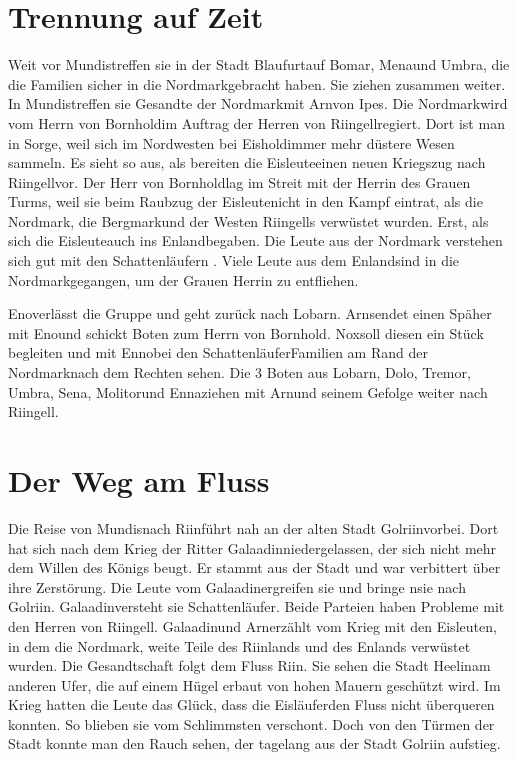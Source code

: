 \documentclass[12pt,a4paper,onecolumn,twoside,ngerman]{book}
\newcommand{\Molitor}{Molitor}
\newcommand{\Sena}{Sena}
\newcommand{\Enland}{Enland}
\newcommand{\Schattenlaufer}{Schattenläufer}
\newcommand{\Eno}{Eno}
\newcommand{\Bomar}{Bomar}
\newcommand{\Dolo}{Dolo}
\newcommand{\Nox}{Nox}
\newcommand{\Mena}{Mena}
\newcommand{\Umbra}{Umbra}
\newcommand{\Enna}{Enna}
\newcommand{\Enno}{Enno}
\newcommand{\Tremor}{Tremor}
\newcommand{\Lobarn}{Lobarn}
\newcommand{\Nordmark}{Nordmark}
\newcommand{\Bergmark}{Bergmark}
\newcommand{\Ipes}{Ipes}
\newcommand{\Bornhold}{Bornhold}
\newcommand{\Eishold}{Eishold}
\newcommand{\Arn}{Arn}
\newcommand{\Eislaufer}{Eisläufer}
\newcommand{\Eisleute}{Eisleute}
\newcommand{\Rhinland}{Riinland}
\newcommand{\Rhingell}{Riingell}
\newcommand{\Blaufurt}{Blaufurt}
\newcommand{\Mundis}{Mundis}
\newcommand{\Helin}{Heelin}
\newcommand{\Golrin}{Golriin}
\newcommand{\Galadin}{Galaadin}
\newcommand{\Rhin}{Riin}
\begin{document}
\section{Trennung auf Zeit}
Weit vor \Mundis  treffen sie in der Stadt \Blaufurt  auf \Bomar , \Mena  und \Umbra , die die Familien sicher in die \Nordmark  gebracht haben. Sie ziehen zusammen weiter. In \Mundis  treffen sie Gesandte der \Nordmark  mit \Arn  von \Ipes . Die \Nordmark wird vom Herrn von \Bornhold im Auftrag der Herren von \Rhingell regiert. Dort ist man in Sorge, weil sich im Nordwesten bei \Eishold  immer mehr düstere Wesen sammeln. Es sieht so aus, als bereiten die \Eisleute  einen neuen Kriegszug nach \Rhingell  vor.
Der Herr von \Bornhold  lag im Streit mit der Herrin des Grauen Turms, weil sie beim Raubzug der \Eisleute  nicht in den Kampf eintrat, als die \Nordmark , die \Bergmark  und der Westen \Rhingell{s} verwüstet wurden. Erst, als sich die \Eisleute  auch ins \Enland  begaben. Die Leute aus der \Nordmark   
  verstehen sich gut mit den \Schattenlaufer{n} . Viele Leute aus dem \Enland  sind in die \Nordmark   gegangen, um der Grauen Herrin zu entfliehen. 

\Eno  verlässt die Gruppe und geht zurück nach \Lobarn . \Arn  sendet einen Späher mit \Eno  und schickt  Boten zum Herrn von \Bornhold . \Nox  soll diesen ein Stück begleiten und mit \Enno  bei den \Schattenlaufer  Familien am Rand der \Nordmark  nach dem Rechten sehen. Die 3 Boten aus \Lobarn , \Dolo , \Tremor , \Umbra, \Sena , \Molitor  und \Enna  ziehen mit \Arn  und seinem Gefolge weiter nach \Rhingell . 

\section{Der Weg am Fluss}
Die Reise von \Mundis  nach \Rhin  führt nah an der alten Stadt \Golrin  vorbei. Dort hat sich nach dem Krieg der Ritter \Galadin  niedergelassen, der sich nicht mehr dem Willen des Königs beugt. Er stammt aus der Stadt und war verbittert über ihre Zerstörung. Die Leute vom \Galadin  ergreifen sie und bringe nsie nach \Golrin  . \Galadin  versteht sie \Schattenlaufer . Beide Parteien haben Probleme mit den Herren von \Rhingell . \Galadin  und  \Arn  erzählt vom Krieg mit den Eisleuten, in dem die \Nordmark , weite Teile des \Rhinland s und des \Enland s verwüstet wurden. 
Die Gesandtschaft folgt dem Fluss \Rhin . Sie sehen die Stadt \Helin  am anderen Ufer, die auf einem Hügel erbaut von hohen Mauern geschützt wird. Im Krieg hatten die Leute das Glück, dass die \Eislaufer  den Fluss nicht überqueren konnten. So blieben sie vom Schlimmsten verschont. Doch von den Türmen der Stadt konnte man den Rauch sehen, der tagelang aus der Stadt \Golrin   
  aufstieg. 
\end{document}
